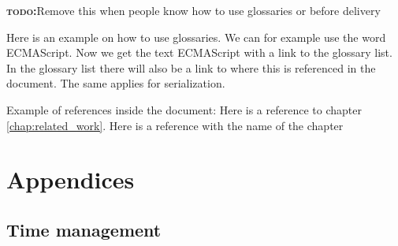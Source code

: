 \documentclass[BSP,english,oneside]{classes/gucthesis}
\newcommand{\comment}[1]{\textcolor{blue}{\emph{#1}}}
\newcommand{\todo}[1]{{\par\noindent\textbf{\textsc{\color{Gray}todo:}}\color{green}#1}}
\begin{document}
\todo{Remove this when people know how to use glossaries or before delivery}
Here is an example on how to use glossaries. We can for example use the word
\gls{ECMAScript}. Now we get the text ECMAScript with a link to the glossary
list. In the glossary list there will also be a link to where this is 
referenced in the document. The same applies for \gls{serialization}.

Example of references inside the document:
	Here is a reference to chapter \ref{chap:related_work}.
	Here is a reference with the name of the chapter 



\part{Appendices}

\appendix %




\printnoidxglossary[sort=word]

\chapter{Time management}
	\label{appx:time_management}
	




% 

% 

% 


\end{document}
